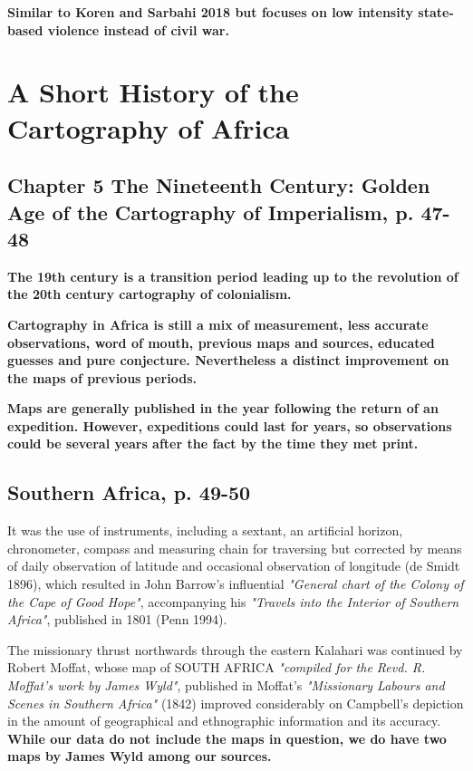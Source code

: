 \documentclass[12pt]{article}
\begin{document}
\textbf{Similar to Koren and Sarbahi 2018 but focuses on low intensity state-based
violence instead of civil war.}

\section{A Short History of the Cartography of Africa \citep{Stone1995}}

\subsection{Chapter 5 The Nineteenth Century: Golden Age of the Cartography of
Imperialism, p. 47-48 }

\textbf{The 19th century is a transition period leading up to the revolution
of the 20th  century cartography of colonialism.}

\textbf{Cartography in Africa is still a mix of measurement, less accurate
observations, word of mouth,  previous maps and sources, educated guesses and
pure conjecture.  Nevertheless a distinct improvement on the maps of previous
periods.}

\textbf{Maps are generally published in the year following the return of an
expedition.  However, expeditions could last for years, so observations could be
several years after the fact by the time they met print.}

\subsection{Southern Africa, p. 49-50}

It was the use of instruments, including a sextant, an artificial horizon,
chronometer, compass and measuring chain for traversing but corrected by means
of daily observation of latitude and occasional observation of longitude (de
Smidt 1896), which resulted in John Barrow's influential 
\textit{"General chart of the Colony of the Cape of Good Hope"}, accompanying
his \textit{"Travels into the Interior of Southern Africa"}, published in 1801
(Penn 1994).

The missionary thrust northwards through the eastern Kalahari was continued by 
Robert Moffat, whose map of SOUTH AFRICA \textit{"compiled for the Revd. R. 
Moffat's work by James Wyld"}, published in Moffat's \textit{"Missionary Labours
and Scenes in Southern Africa"} (1842) improved considerably on Campbell's 
depiction in the amount of geographical and ethnographic information and its 
accuracy. \textbf{While our data do not include the maps in question, we do have
two maps by James Wyld among our sources.}
\end{document}
